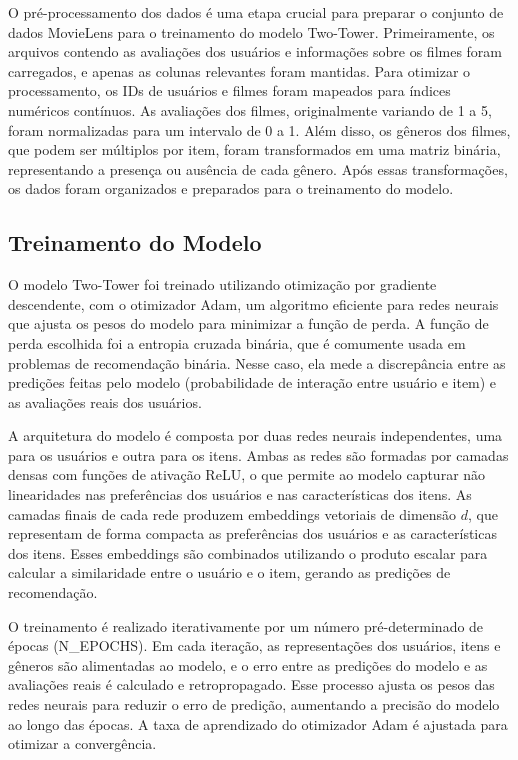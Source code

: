 \documentclass[sigconf]{acmart}
\begin{document}
O pré-processamento dos dados é uma etapa crucial para preparar o conjunto de dados MovieLens para o treinamento do modelo Two-Tower. Primeiramente, os arquivos contendo as avaliações dos usuários e informações sobre os filmes foram carregados, e apenas as colunas relevantes foram mantidas. Para otimizar o processamento, os IDs de usuários e filmes foram mapeados para índices numéricos contínuos. As avaliações dos filmes, originalmente variando de 1 a 5, foram normalizadas para um intervalo de 0 a 1. Além disso, os gêneros dos filmes, que podem ser múltiplos por item, foram transformados em uma matriz binária, representando a presença ou ausência de cada gênero. Após essas transformações, os dados foram organizados e preparados para o treinamento do modelo.

\subsection{Treinamento do Modelo}

O modelo Two-Tower foi treinado utilizando otimização por gradiente descendente, com o otimizador Adam, um algoritmo eficiente para redes neurais que ajusta os pesos do modelo para minimizar a função de perda. A função de perda escolhida foi a entropia cruzada binária, que é comumente usada em problemas de recomendação binária. Nesse caso, ela mede a discrepância entre as predições feitas pelo modelo (probabilidade de interação entre usuário e item) e as avaliações reais dos usuários.

A arquitetura do modelo é composta por duas redes neurais independentes, uma para os usuários e outra para os itens. Ambas as redes são formadas por camadas densas com funções de ativação ReLU, o que permite ao modelo capturar não linearidades nas preferências dos usuários e nas características dos itens. As camadas finais de cada rede produzem embeddings vetoriais de dimensão \(d\), que representam de forma compacta as preferências dos usuários e as características dos itens. Esses embeddings são combinados utilizando o produto escalar para calcular a similaridade entre o usuário e o item, gerando as predições de recomendação.

O treinamento é realizado iterativamente por um número pré-determinado de épocas (N\_EPOCHS). Em cada iteração, as representações dos usuários, itens e gêneros são alimentadas ao modelo, e o erro entre as predições do modelo e as avaliações reais é calculado e retropropagado. Esse processo ajusta os pesos das redes neurais para reduzir o erro de predição, aumentando a precisão do modelo ao longo das épocas. A taxa de aprendizado do otimizador Adam é ajustada para otimizar a convergência.
\end{document}
